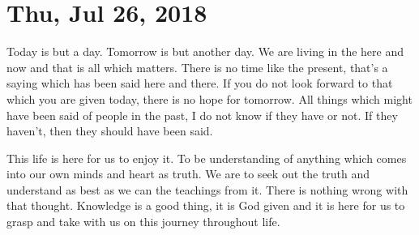 \section{Thu, Jul 26, 2018}

Today is but a day. Tomorrow is but another day. We are living in the here and now
and that is all which  matters. There is no time like the present, that's a saying
which has been said here and there. If you do not look forward to that which you are
given today, there is no hope for tomorrow. All things which might have been said of
people in the past, I do not know if they have or not. If they haven't, then they
should have been said.

This life is here for us to enjoy it. To be understanding of anything which comes
into our own minds and heart as truth. We are to seek out the truth and understand as
best as we can the teachings from it. There is nothing wrong with that thought.
Knowledge is a good thing, it is God given and it is here for us to grasp and take
with us on this journey throughout life.
